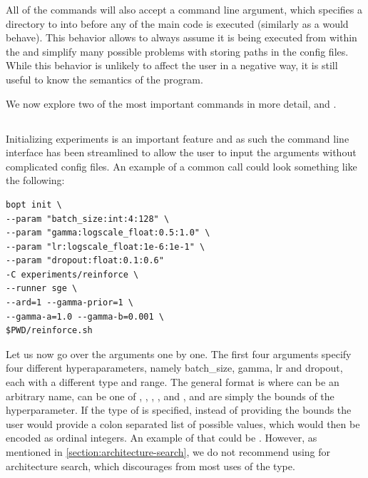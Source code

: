 All of the \bopt commands will also accept a  command line argument, which specifies a directory to  into before any of the main code is executed (similarly as a  would behave). This behavior allows \bopt to always assume it is being executed from within the  and simplify many possible problems with storing paths in the config files. While this behavior is unlikely to affect the user in a negative way, it is still useful to know the semantics of the program.

We now explore two of the most important commands in more detail,  and .

\subsection{}

Initializing experiments is an important feature and as such the command line interface has been streamlined to allow the user to input the arguments without complicated config files. An example of a common  call could look something like the following:

\begin{center}
\begin{verbatim}
bopt init \
--param "batch_size:int:4:128" \
--param "gamma:logscale_float:0.5:1.0" \
--param "lr:logscale_float:1e-6:1e-1" \
--param "dropout:float:0.1:0.6"
-C experiments/reinforce \
--runner sge \
--ard=1 --gamma-prior=1 \
--gamma-a=1.0 --gamma-b=0.001 \
$PWD/reinforce.sh
\end{verbatim}	
\end{center}


Let us now go over the arguments one by one. The first four arguments specify four different hyperaparameters, namely batch\_size, gamma, lr and dropout, each with a different type and range. The general format is  where  can be an arbitrary name,  can be one of , , , , and , and  are simply the bounds of the hyperparameter. If the type of  is specified, instead of providing the bounds the user would provide a colon separated list of possible values, which would then be encoded as ordinal integers. An example of that could be . However, as mentioned in \autoref{section:architecture-search}, we do not recommend using \bopt for architecture search, which discourages from most uses of the  type.

